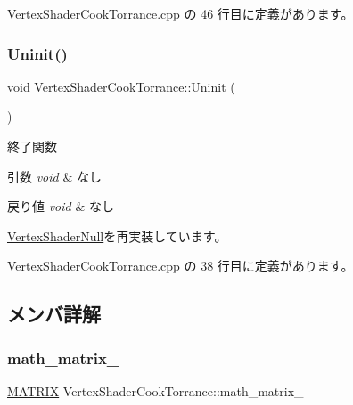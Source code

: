  Vertex\+Shader\+Cook\+Torrance.\+cpp の 46 行目に定義があります。

\mbox{\label{class_vertex_shader_cook_torrance_ab2cc9cc8ed675abc5f1194a82bc8d405}} 
\subsubsection{\texorpdfstring{Uninit()}{Uninit()}}
{\footnotesize\ttfamily void Vertex\+Shader\+Cook\+Torrance\+::\+Uninit (\begin{DoxyParamCaption}{ }\end{DoxyParamCaption})\hspace{0.3cm}{\ttfamily [virtual]}}



終了関数 


\begin{DoxyParams}{引数}
{\em void} & なし \\
\hline
\end{DoxyParams}

\begin{DoxyRetVals}{戻り値}
{\em void} & なし \\
\hline
\end{DoxyRetVals}


\mbox{\hyperlink{class_vertex_shader_null_adf758f295d2803c6d8bd7e05e461abec}{Vertex\+Shader\+Null}}を再実装しています。



 Vertex\+Shader\+Cook\+Torrance.\+cpp の 38 行目に定義があります。



\subsection{メンバ詳解}
\mbox{\label{class_vertex_shader_cook_torrance_aa1eed2962c042b4baee83f6395eee61e}} 
\subsubsection{\texorpdfstring{math\+\_\+matrix\+\_\+}{math\_matrix\_}}
{\footnotesize\ttfamily \mbox{\hyperlink{_matrix_8h_a032295cd9fb1b711757c90667278e744}{M\+A\+T\+R\+IX}} Vertex\+Shader\+Cook\+Torrance\+::math\+\_\+matrix\+\_\+\hspace{0.3cm}{\ttfamily [private]}}



